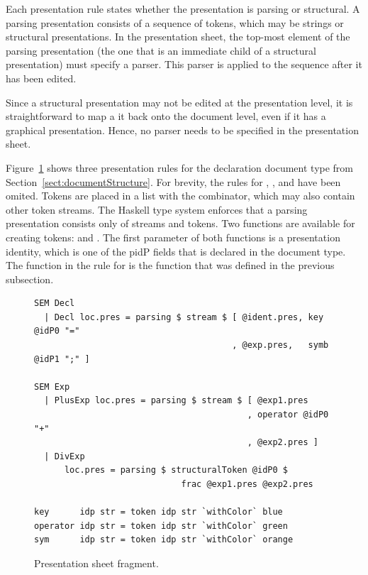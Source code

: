 \documentclass[12pt]{article}
\begin{document}

Each presentation rule states whether the presentation is parsing or structural. A parsing presentation consists of a sequence of tokens, which may be strings or structural presentations. In the presentation sheet, the top-most element of the parsing presentation (the one that is an immediate child of a structural presentation) must specify a parser. This parser is applied to the sequence after it has been edited.

Since a structural presentation may not be edited at the presentation level, it is straightforward to map a it back onto the document level, even if it has a graphical presentation. Hence, no parser needs to be specified in the presentation sheet.

Figure~\ref{fig:presentationSheet} shows three presentation rules for the declaration document type from Section~\ref{sect:documentStructure}. For brevity, the rules for , , and  have been omited. Tokens are placed in a list with the  combinator, which may also contain other token streams. The Haskell type system enforces that a parsing presentation consists only of streams and tokens. Two functions are available for creating tokens:  and . The first parameter of both functions is a presentation identity, which is one of the p{idP} fields that is declared in the document type. The function  in the rule for  is the function that was defined in the previous subsection.


\begin{figure}
\begin{center}
\begin{footnotesize}
\begin{verbatim}
SEM Decl
  | Decl loc.pres = parsing $ stream $ [ @ident.pres, key @idP0 "="
                                       , @exp.pres,   symb @idP1 ";" ]

SEM Exp
  | PlusExp loc.pres = parsing $ stream $ [ @exp1.pres
                                          , operator @idP0 "+"
                                          , @exp2.pres ]
  | DivExp
      loc.pres = parsing $ structuralToken @idP0 $ 
                             frac @exp1.pres @exp2.pres
                  
key      idp str = token idp str `withColor` blue
operator idp str = token idp str `withColor` green
sym      idp str = token idp str `withColor` orange
\end{verbatim}
\end{footnotesize}
\caption{Presentation sheet fragment.} \label{fig:presentationSheet} 
\end{center}
\end{figure}
\end{document}
